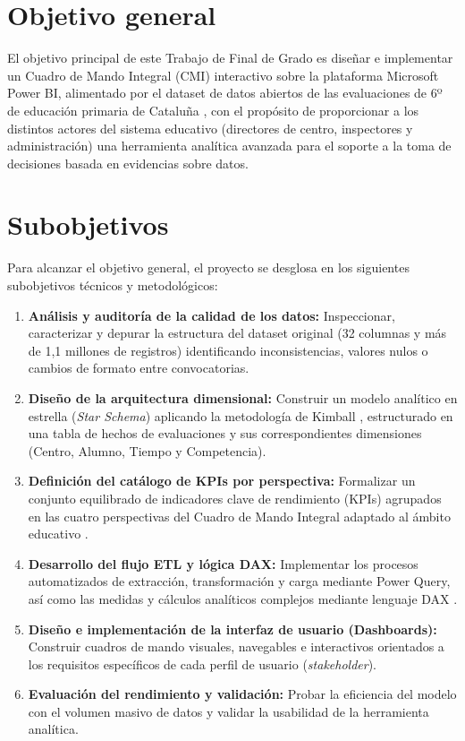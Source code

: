 \documentclass[12pt, a4paper, twoside]{report}
\begin{document}
\section{Objetivo general}
El objetivo principal de este Trabajo de Final de Grado es diseñar e implementar un Cuadro de Mando Integral (CMI) interactivo sobre la plataforma Microsoft Power BI, alimentado por el dataset de datos abiertos de las evaluaciones de 6º de educación primaria de Cataluña \cite{transparencia_catalunya_2024}, con el propósito de proporcionar a los distintos actores del sistema educativo (directores de centro, inspectores y administración) una herramienta analítica avanzada para el soporte a la toma de decisiones basada en evidencias sobre datos.

\section{Subobjetivos}
Para alcanzar el objetivo general, el proyecto se desglosa en los siguientes subobjetivos técnicos y metodológicos:

\begin{enumerate}
    \item \textbf{Análisis y auditoría de la calidad de los datos:} Inspeccionar, caracterizar y depurar la estructura del dataset original (32 columnas y más de 1,1 millones de registros) identificando inconsistencias, valores nulos o cambios de formato entre convocatorias.
    \item \textbf{Diseño de la arquitectura dimensional:} Construir un modelo analítico en estrella (\textit{Star Schema}) aplicando la metodología de Kimball \cite{kimball2013data}, estructurado en una tabla de hechos de evaluaciones y sus correspondientes dimensiones (Centro, Alumno, Tiempo y Competencia).
    \item \textbf{Definición del catálogo de KPIs por perspectiva:} Formalizar un conjunto equilibrado de indicadores clave de rendimiento (KPIs) agrupados en las cuatro perspectivas del Cuadro de Mando Integral adaptado al ámbito educativo \cite{niven2008balanced}.
    \item \textbf{Desarrollo del flujo ETL y lógica DAX:} Implementar los procesos automatizados de extracción, transformación y carga mediante Power Query, así como las medidas y cálculos analíticos complejos mediante lenguaje DAX \cite{ferrari2016definitive}.
    \item \textbf{Diseño e implementación de la interfaz de usuario (Dashboards):} Construir cuadros de mando visuales, navegables e interactivos orientados a los requisitos específicos de cada perfil de usuario (\textit{stakeholder}).
    \item \textbf{Evaluación del rendimiento y validación:} Probar la eficiencia del modelo con el volumen masivo de datos y validar la usabilidad de la herramienta analítica.
\end{enumerate}
\end{document}
